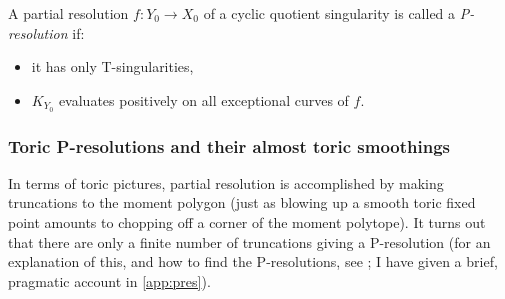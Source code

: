 \documentclass{article}
\begin{document}
\begin{Definition}[P-resolution]\label{dfn:pres}
A partial resolution \(f\colon Y_0\to X_0\) of a cyclic quotient
singularity is called a {\em P-resolution} if:
\begin{itemize}
\item it has only T-singularities,
\item \(K_{Y_0}\) evaluates positively on all exceptional curves of
\(f\).


\end{itemize}
\end{Definition}
\subsubsection{Toric P-resolutions and their almost toric smoothings}


In terms of toric pictures, partial resolution is accomplished by
making truncations to the moment polygon (just as blowing up a smooth
toric fixed point amounts to chopping off a corner of the moment
polytope). It turns out that there are only a finite number of
truncations giving a P-resolution (for an explanation of this, and how
to find the P-resolutions, see {\cite[Section 3]{KSB}}; I have given a
brief, pragmatic account in \cref{app:pres}).
\end{document}
